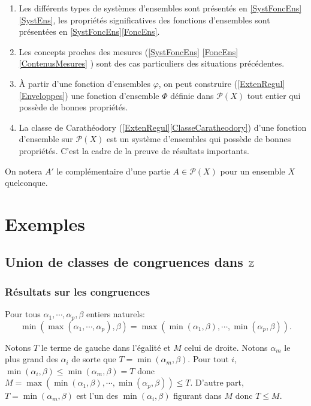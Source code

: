 \begin{enumerate}
 \item  Les différents types de systèmes d'ensembles sont présentés en \ref{SystFoncEns}\ref{SystEns}, les propriétés significatives des fonctions d'ensembles sont présentées en \ref{SystFoncEns}\ref{FoncEns}.
 \item Les concepts proches des mesures (\ref{SystFoncEns} \ref{FoncEns} \ref{ContenusMesures} ) sont des cas particuliers des situations précédentes.
 \item À partir d'une fonction d'ensembles $\varphi$, on peut construire (\ref{ExtenRegul} \ref{Enveloppes}) une fonction d'ensemble $\Phi$ définie dans $\mathcal{P}(X)$ tout entier qui possède de bonnes propriétés.
 \item La classe de Carathéodory (\ref{ExtenRegul}\ref{ClasseCaratheodory}) d'une fonction d'ensemble sur $\mathcal{P}(X)$ est un système d'ensembles qui possède de bonnes propriétés. C'est la cadre de la preuve de résultats importants.
\end{enumerate}

On notera $A'$ le complémentaire d'une partie $A \in \mathcal{P}(X)$ pour un ensemble $X$ quelconque.
\newpage

\section{Exemples}\label{Exples}
\subsection{Union de classes de congruences dans $\mathbb{Z}$} \label{ExpleZ}

\subsubsection{Résultats sur les congruences}
\begin{lem}
  Pour tous $\alpha_1, \cdots, \alpha_p, \beta$ entiers naturels:
  \begin{displaymath}
    \min \left( \max(\alpha_1, \cdots, \alpha_p) , \beta \right) = \max\left( \min(\alpha_1, \beta), \cdots , \min(\alpha_p,\beta)\right).
  \end{displaymath}
\end{lem}
\begin{demo}
  Notons $T$ le terme de gauche dans l'égalité et $M$ celui de droite. Notons $\alpha_m$ le plus grand des $\alpha_i$ de sorte que $T = \min(\alpha_m, \beta)$.\newline
  Pour tout $i$, $\min(\alpha_i, \beta) \leq \min (\alpha_m, \beta) = T$ donc $M = \max\left( \min(\alpha_1, \beta), \cdots , \min(\alpha_p,\beta)\right) \leq T$.\newline
  D'autre part, $T=\min (\alpha_m, \beta)$ est l'un des $\min(\alpha_i, \beta)$ figurant dans $M$ donc $T \leq M$.
\end{demo}

